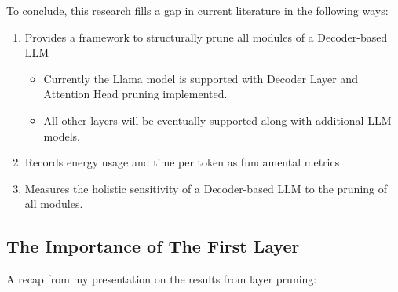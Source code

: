 \documentclass{article}
\begin{document}
    To conclude, this research fills a gap in current literature in the following ways:

    \begin{enumerate}
        \item Provides a framework to structurally prune all modules of a Decoder-based LLM
        \begin{itemize}
            \item Currently the Llama model is supported with Decoder Layer and Attention Head pruning implemented.
            \item All other layers will be eventually supported along with additional LLM models.
        \end{itemize}
        \item Records energy usage and time per token as fundamental metrics
        \item Measures the holistic sensitivity of a Decoder-based LLM to the pruning of all modules.
    \end{enumerate}

    \subsection{The Importance of The First Layer}\label{subsec:first-layer}

    A recap from my presentation on the results from layer pruning:
\end{document}
